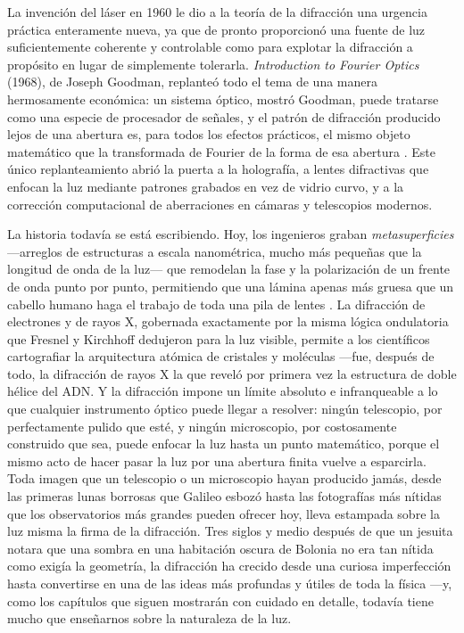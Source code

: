 	La invención del láser en 1960 le dio a la teoría de la difracción una urgencia práctica enteramente nueva, ya que de pronto proporcionó una fuente de luz suficientemente coherente y controlable como para explotar la difracción a propósito en lugar de simplemente tolerarla. \textit{Introduction to Fourier Optics} (1968), de Joseph Goodman, replanteó todo el tema de una manera hermosamente económica: un sistema óptico, mostró Goodman, puede tratarse como una especie de procesador de señales, y el patrón de difracción producido lejos de una abertura es, para todos los efectos prácticos, el mismo objeto matemático que la transformada de Fourier de la forma de esa abertura \cite{goodman2005introduction}. Este único replanteamiento abrió la puerta a la holografía, a lentes difractivas que enfocan la luz mediante patrones grabados en vez de vidrio curvo, y a la corrección computacional de aberraciones en cámaras y telescopios modernos.

	La historia todavía se está escribiendo. Hoy, los ingenieros graban \textit{metasuperficies} —arreglos de estructuras a escala nanométrica, mucho más pequeñas que la longitud de onda de la luz— que remodelan la fase y la polarización de un frente de onda punto por punto, permitiendo que una lámina apenas más gruesa que un cabello humano haga el trabajo de toda una pila de lentes \cite{yu2011light}. La difracción de electrones y de rayos X, gobernada exactamente por la misma lógica ondulatoria que Fresnel y Kirchhoff dedujeron para la luz visible, permite a los científicos cartografiar la arquitectura atómica de cristales y moléculas —fue, después de todo, la difracción de rayos X la que reveló por primera vez la estructura de doble hélice del ADN. Y la difracción impone un límite absoluto e infranqueable a lo que cualquier instrumento óptico puede llegar a resolver: ningún telescopio, por perfectamente pulido que esté, y ningún microscopio, por costosamente construido que sea, puede enfocar la luz hasta un punto matemático, porque el mismo acto de hacer pasar la luz por una abertura finita vuelve a esparcirla. Toda imagen que un telescopio o un microscopio hayan producido jamás, desde las primeras lunas borrosas que Galileo esbozó hasta las fotografías más nítidas que los observatorios más grandes pueden ofrecer hoy, lleva estampada sobre la luz misma la firma de la difracción. Tres siglos y medio después de que un jesuita notara que una sombra en una habitación oscura de Bolonia no era tan nítida como exigía la geometría, la difracción ha crecido desde una curiosa imperfección hasta convertirse en una de las ideas más profundas y útiles de toda la física —y, como los capítulos que siguen mostrarán con cuidado en detalle, todavía tiene mucho que enseñarnos sobre la naturaleza de la luz.

